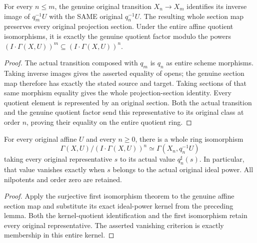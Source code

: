 \begin{lemma}
\label{lem:fibre-infinitesimal-affine-transitions}
\leanok
For every $n\le m$, the genuine original transition $X_n\to X_m$
identifies its inverse image of $q_m^{-1}U$ with the SAME original
$q_n^{-1}U$. The resulting whole section map preserves every original
projection section. Under the entire affine quotient isomorphisms, it
is exactly the genuine quotient factor modulo the powers
$(I\cdot\Gamma(X,U))^m\subseteq(I\cdot\Gamma(X,U))^n$.
\end{lemma}
\begin{proof}
The actual transition composed with $q_m$ is $q_n$ as entire scheme
morphisms. Taking inverse images gives the asserted equality of opens;
the genuine section map therefore has exactly the stated source and
target. Taking sections of that same morphism equality gives the whole
projection-section identity. Every quotient element is represented by
an original section. Both the actual transition and the genuine
quotient factor send this representative to its original class at
order $n$, proving their equality on the entire quotient ring.
\end{proof}

\begin{lemma}
\label{lem:fibre-infinitesimal-affine-quotient}
\leanok
For every original affine $U$ and every $n\ge0$, there is a whole ring
isomorphism
\[
 \Gamma(X,U)/(I\cdot\Gamma(X,U))^n
 \simeq \Gamma(X_n,q_n^{-1}U)
\]
taking every original representative $s$ to its actual value
$q_n^\sharp(s)$. In particular, that value vanishes exactly when $s$
belongs to the actual original ideal power. All nilpotents and order
zero are retained.
\end{lemma}
\begin{proof}
Apply the surjective first isomorphism theorem to the genuine affine
section map and substitute its exact ideal-power kernel from the
preceding lemma. Both the kernel-quotient identification and the first
isomorphism retain every original representative. The asserted
vanishing criterion is exactly membership in this entire kernel.
\end{proof}

